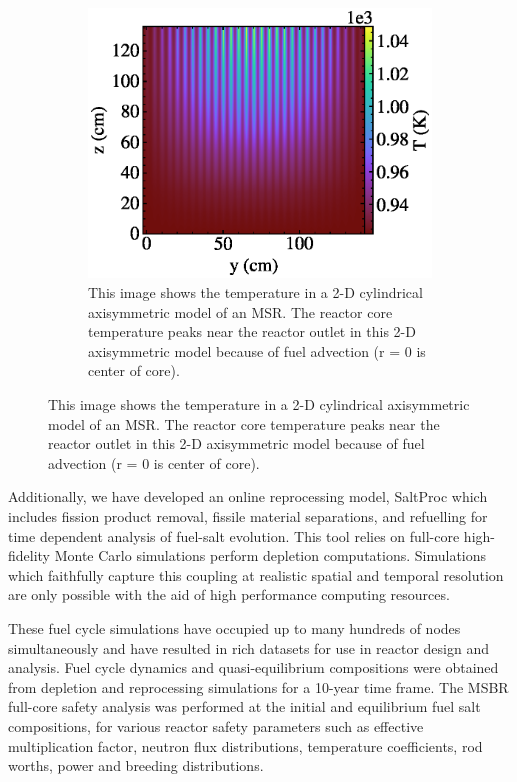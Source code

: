 \documentclass[letterpaper]{article}
\begin{document}
\begin{figure}[htb]
\begin{subfigure}{0.4\textwidth}
        \begin{center}
                \includegraphics[width=\textwidth]{temp.eps}
        \end{center}
        \caption{This image shows the temperature in a 2-D cylindrical 
        axisymmetric model of an MSR. The reactor core temperature peaks near 
the reactor outlet in this 2-D axisymmetric model because of fuel advection (r 
= 0 is center of core).}%
        \label{fig:temp}
        \end{subfigure}%
\end{figure}


Additionally, we have developed
an online reprocessing model, SaltProc which includes fission product removal, fissile material
separations, and refuelling for time dependent analysis of fuel-salt evolution.
This tool relies on full-core high-fidelity Monte Carlo simulations perform depletion
computations. Simulations which faithfully capture this coupling at realistic spatial and
temporal resolution are only possible with the aid of high performance
computing resources.

These fuel cycle simulations have occupied up to many hundreds of nodes
simultaneously and have resulted in rich datasets for use in reactor design and
analysis.  Fuel cycle dynamics and quasi-equilibrium compositions were obtained
from depletion and reprocessing simulations for a 10-year time frame. The MSBR
full-core safety analysis was performed at the initial and equilibrium fuel
salt compositions, for various reactor safety parameters such as effective
multiplication factor, neutron flux distributions, temperature coefficients,
rod worths, power and breeding distributions.
\end{document}
